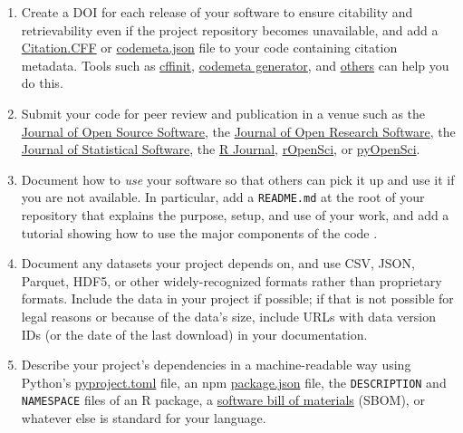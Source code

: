 \documentclass[10pt,letterpaper]{article}
\begin{document}
\begin{enumerate}

\item
  Create a DOI for each release of your software
  to ensure citability and retrievability even if the project repository becomes unavailable,
  and add a \href{https://citation-file-format.github.io/}{Citation.CFF}
  or \href{https://codemeta.github.io}{codemeta.json} file to your code \cite{Druskat2021}
  containing citation metadata.
  Tools such as \href{https://citation-file-format.github.io/cff-initializer-javascript/}{cffinit},
  \href{https://codemeta.github.io/codemeta-generator/}{codemeta generator},
  and \href{https://github.com/citation-file-format/citation-file-format/blob/main/README.md\#tools-to-work-with-citationcff-files-wrench}{others}
  can help you do this.

\item
  Submit your code for peer review and publication in a venue such as
  the \href{https://joss.theoj.org/}{Journal of Open Source Software},
  the \href{https://openresearchsoftware.metajnl.com/}{Journal of Open Research Software},
  the \href{http://www.jstatsoft.org}{Journal of Statistical Software},
  the \href{https://journal.r-project.org/}{R Journal},
  \href{https://ropensci.org/}{rOpenSci},
  or \href{https://www.pyopensci.org}{pyOpenSci}.

\item
  Document how to \emph{use} your software so that others can pick it up and use it if you are not available.
  In particular,
  add a \texttt{README.md} at the root of your repository
  that explains the purpose, setup, and use of your work,
  and add a tutorial showing how to use the major components of the code
  \cite{Lee2018b,Huybrechts2024,Littauer2025,Katz2025,Turing2025}.

\item
  Document any datasets your project depends on,
  and use CSV, JSON, Parquet, HDF5, or other widely-recognized formats rather than proprietary formats.
  Include the data in your project if possible;
  if that is not possible for legal reasons or because of the data's size,
  include URLs with data version IDs (or the date of the last download) in your documentation.

\item
  Describe your project's dependencies in a machine-readable way
  using Python's \href{https://packaging.python.org/en/latest/guides/writing-pyproject-toml/}{pyproject.toml} file,
  an npm \href{https://docs.npmjs.com/cli/v10/configuring-npm/package-json?v=true}{package.json} file,
  the \texttt{DESCRIPTION} and \texttt{NAMESPACE} files of an R package,
  a \href{https://openssf.org/technical-initiatives/sbom-tools/}{software bill of materials} (SBOM),
  or whatever else is standard for your language.


\end{enumerate}
\end{document}
